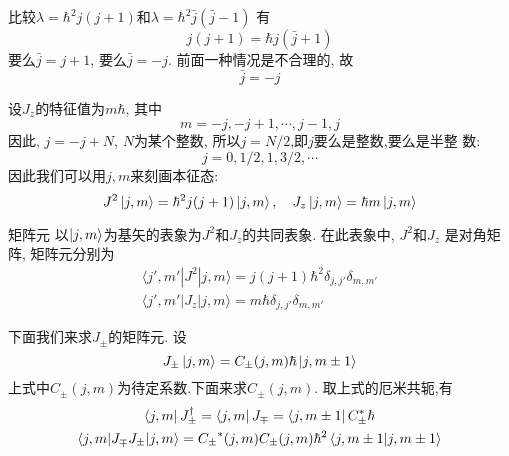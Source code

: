 \documentclass{beamer}
\begin{document}
\begin{frame}
比较$\lambda = \hbar^2 j (j + 1)$和$\lambda = \hbar^2 \bar{j}(\bar{j} - 1)$
有
\begin{equation}
j(j+1) = \hbar{j} (\bar{j} + 1)
\end{equation}
要么$\bar{j} = j + 1$, 要么$\bar{j} = -j$. 前面一种情况是不合理的, 故
\begin{equation}
\bar{j} = -j
\end{equation}
\end{frame}

\begin{frame}
设$J_z$的特征值为$m\hbar$, 其中
\begin{equation}
m = -j, -j+1, \cdots, j-1, j
\end{equation}
因此, $j = -j + N$, $N$为某个整数, 所以$j = N/2$,即$j$要么是整数,要么是半整
数:
\begin{equation}
j = 0, 1/2, 1, 3/2, \cdots
\end{equation}
因此我们可以用$j,m$来刻画本征态:
\begin{equation}
J^2 \ket{j,m} = \hbar^2 j (j + 1) \ket{j,m}, \quad J_z \ket{j,m} = \hbar m \ket{j,m}
\end{equation}
\end{frame}

\begin{frame}{矩阵元}
以$\ket{j,m}$为基矢的表象为$J^2$和$J_z$的共同表象. 在此表象中, $J^2$和$J_z$
是对角矩阵, 矩阵元分别为
\begin{gather}
\langle j', m' | J^2 | j,m \rangle = j(j+1)\hbar^2 \delta_{j,j'} \delta_{m,m'} \\
\langle j', m' | J_z | j,m \rangle = m \hbar \delta_{j,j'} \delta_{m,m'}
\end{gather}

下面我们来求$J_\pm$的矩阵元. 设
\begin{equation}
J_\pm \ket{j,m} = C_\pm (j,m) \hbar \ket{j,m \pm 1}
\end{equation}
上式中$C_\pm (j,m)$为待定系数.下面来求$C_\pm (j,m)$. 取上式的厄米共轭,有
\begin{gather}
\bra{j,m}{J_\pm}^\dag = \bra{j,m} J_\mp = \bra{j,m \pm 1} {C_\pm}^* \hbar \\
\langle j,m | J_\mp J_\pm | j,m \rangle = {C_\pm}^*(j,m) C_\pm (j,m) \hbar^2 \braket{j,m\pm 1}{j,m\pm 1}
\end{gather}
\end{frame}
\end{document}
